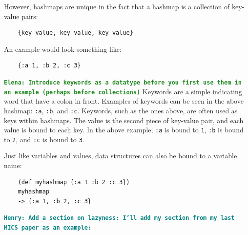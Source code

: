 \documentclass[12pt]{article}
\newcommand{\comment}[1]{{\bf \tt  {#1}}}
\newcommand{\emcomment}[1]{\textcolor{ForestGreen}{\comment{Elena: {#1}}}}
\newcommand{\hfcomment}[1]{\textcolor{Teal}{\comment{Henry: {#1}}}}
\begin{document}
However, hashmaps are unique in the fact that a hashmap is a collection of key-value pairs: 
\begin{verbatim}
	{key value, key value, key value}
\end{verbatim}

An example 
 would look something like:
\begin{verbatim}
	{:a 1, :b 2, :c 3}
\end{verbatim}

\emcomment{Introduce keywords as a datatype before you first use them in an example (perhaps before collections)}
Keywords are a simple indicating word that have a colon in front. Examples of keywords can be seen in the
above hashmap: \texttt{:a}, \texttt{:b}, and \texttt{:c}. Keywords, such as the ones above,
are often used as keys within hashmaps. The value is the second piece of key-value pair,
and each value is bound to each key. In the above example, \texttt{:a} is bound to \texttt{1}, \texttt{:b}
is bound to \texttt{2}, and \texttt{:c} is bound to \texttt{3}.


Just like variables and values, data structures can also be bound to a
variable name: 
\begin{verbatim}
	(def myhashmap {:a 1 :b 2 :c 3})
	myhashmap
	-> {:a 1, :b 2, :c 3}
\end{verbatim}

\hfcomment{Add a section on lazyness: I'll add my section from my last MICS paper as an example:}
\end{document}
